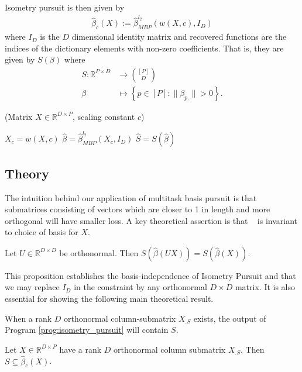 Isometry pursuit is then given by
\begin{align}
\label{prog:isometry_pursuit}
\widehat \beta_c ( X) := \widehat \beta_{MBP}^{l_2} ( w(X,c), I_D )
\end{align}
where $I_D$ is the $D$ dimensional identity matrix and recovered functions are the indices of the dictionary elements with non-zero coefficients.
That is, they are given by $S(\beta)$ where
\begin{align}
S: \mathbb{R}^{P \times D} &\to \binom{[P]}{D} \\
\beta &\mapsto \left\{ p \in [P] :  \|\beta_{p.}\| > 0 \right\}.
\end{align}
\begin{algorithm}[H]
\caption{\isometrypursuit(Matrix ${X} \in \mathbb{R}^{D \times P}$, scaling constant $c$)}
\begin{algorithmic}[1]
 $X_c = w({X},c)$
 $\widehat \beta = \widehat \beta_{MBP}^{l_2} (X_c, I_D)$
 $\widehat{S} = S (\widehat \beta)$
\end{algorithmic}
\end{algorithm}

\subsection{Theory}

The intuition behind our application of multitask basis pursuit is that submatrices consisting of vectors which are closer to 1 in length and more orthogonal will have smaller loss.
A key theoretical assertion is that \isometrypursuit~ is invariant to choice of basis for $ X$.
\begin{proposition}
\label{prop:basis_pursuit_selection_invariance}
Let $U \in \mathbb R^{D \times D}$ be orthonormal.
Then $S(\widehat \beta  (U  X)) = S(\widehat \beta ( X))$.
\end{proposition}
This proposition establishes the basis-independence of Isometry Pursuit and that we may replace $I_D$ in the constraint by any orthonormal $D \times D$ matrix.
It is also essential for showing the following main theoretical result.

When a rank $D$ orthonormal column-submatrix $X_{.S}$ exists, the output of Program \ref{prog:isometry_pursuit} will contain $S$.
\begin{proposition}
Let $X \in \mathbb R^{D \times P}$ have a rank $D$ orthonormal column submatrix $X_{.S}$.
Then $S \subseteq \widehat \beta_c ( X)$.
\label{prop:unitary_selection}
\end{proposition}


